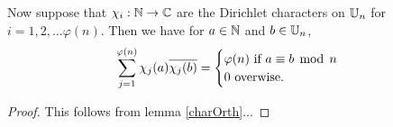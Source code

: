 \documentclass{unswmaths}
\begin{document}
    \begin{lemma}
        Now suppose that $\chi_i:\mathbb{N} \rightarrow \mathbb{C}$ are the Dirichlet characters on $\mathbb{U}_n$ for $i = 1,2,\ldots \varphi(n)$. Then we have for $a \in \mathbb{N}$ and $b\in \mathbb{U}_n$,
        \begin{equation*}
            \sum_{j=1}^{\varphi(n)} \chi_j(a)\overline{\chi_j(b)} = \begin{cases}
                \varphi(n)\text{ if }a \equiv b\;\operatorname{mod}\;n\\
                0\text{ overwise.}
            \end{cases}
        \end{equation*}
    \end{lemma}
    \begin{proof}
        This follows from lemma \ref{charOrth}...
    \end{proof}
    
\end{document}

